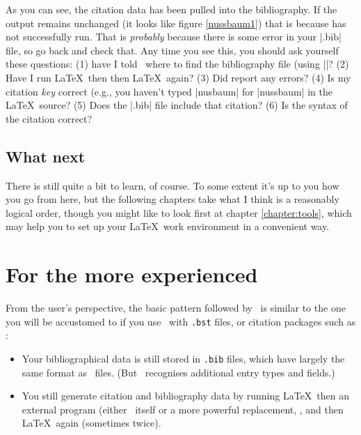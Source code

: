 As you can see, the citation data has been pulled into the bibliography. If the output remains unchanged (it looks like figure \ref{nussbaum1}) that is because  has not successfully run. That is \emph{probably} because there is some error in your |.bib| file, so go back and check that. Any time you see this, you should ask yourself these questions: (1) have I told \biblatex\ where to find the bibliography file (using ||? (2) Have I run \LaTeX\ then  then \LaTeX\ again? (3) Did  report any errors? (4) Is my citation \emph{key} correct (e.g., you haven't typed |nusbaum| for |nussbaum| in the \LaTeX\ source? (5) Does the |.bib| file include that citation? (6) Is the syntax of the citation correct?
\subsection{What next}

There is still quite a bit to learn, of course. To some extent it's up to you how you go from here, but the following chapters take what I think is a reasonably logical order, though you might like to look first at chapter \ref{chapter:tools}, which may help you to set up your \LaTeX\ work environment in a convenient way.

\section{For the more experienced}

From the user's perspective, the basic pattern followed by \biblatex\ is similar to the one you will be accustomed to if you use \bibtex\ with \verb|.bst| files, or citation packages such as :
\begin{itemize}
\item Your bibliographical data is still stored in \verb|.bib| files, which have largely the same format as \bibtex\ files. (But \biblatex\ recognises additional entry types and fields.)
\item You still generate citation and bibliography data by running \LaTeX\, then an external program (either \bibtex\ itself or a more powerful replacement, , and then \LaTeX\ again (sometimes twice).
\end{itemize}

